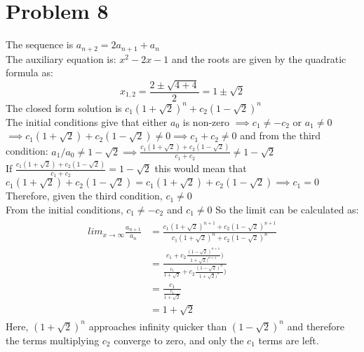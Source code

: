 \documentclass[english]{article}
\begin{document}
 \section*{Problem 8}
 The sequence is $a_{n+2} = 2a_{n+1} + a_n$ 
 \\ The auxiliary equation is: $x^2 - 2x - 1$ and the roots are given by the quadratic formula as:
 $$ x_{1,2} = \frac{2 \pm \sqrt{4+4}}{2} = 1 \pm \sqrt{2}$$ 
 The closed form solution is $c_1 (1+\sqrt{2})^n + c_2 (1-\sqrt{2})^n$ \\ 
 The initial conditions give that either $a_0$ is non-zero $\implies c_1 \neq -c_2$ or $a_1 \neq 0$
 $ \implies c_1 (1 + \sqrt{2}) + c_2 (1 - \sqrt{2}) \neq 0 \implies c_1 + c_2 \neq 0 $ and from the third condition: 
 $a_1 / a_0 \neq 1 - \sqrt{2} \implies \frac{c_1(1+ \sqrt{2}) + c_2 (1 - \sqrt{2})}{c_1 + c_2} \neq 1 - \sqrt{2}$  \\ 
  If $ \frac{c_1(1+ \sqrt{2}) + c_2 (1 - \sqrt{2})}{c_1 + c_2} = 1 - \sqrt{2} $ this would mean that $c_1(1 + \sqrt{2}) +  c_2 (1 - \sqrt{2}) = c_1 (1 + \sqrt{2}) + c_2 (1 - \sqrt{2}) \implies c_1 = 0$ Therefore, given the third condition, $c_1 \neq 0$
 \\ From the initial conditions, $c_1 \neq - c_2$ and $c_1 \neq 0$ So the limit can be calculated as:
\begin{align*} 
\begin{split}
lim_{x \to \infty} \frac{a_{n+1}}{a_n} & = \frac{c_1 (1+\sqrt{2})^{n+1} + c_2 (1-\sqrt{2})^{n+1}}{c_1 (1+\sqrt{2})^n + c_2 (1-\sqrt{2})^n} \\
& = \frac{c_1  + c_2  \frac{(1-\sqrt{2})^{n+1}}{1+\sqrt{2})^{n+1}})}{\frac{c_1}{1+\sqrt{2}} + c_2  \frac{(1-\sqrt{2})^{n}}{1+\sqrt{2})^{n}})}  \\ 
& = \frac{c_1}{\frac{c_1}{1+\sqrt{2}}} \\
& = 1+\sqrt{2} 
\end{split}
\end{align*}
 Here, $(1+ \sqrt{2})^n$ approaches infinity quicker than $(1 - \sqrt{2})^n$ and therefore the terms multiplying $c_2$ converge to zero, and only the $c_1$ terms are left.\\
\end{document}
